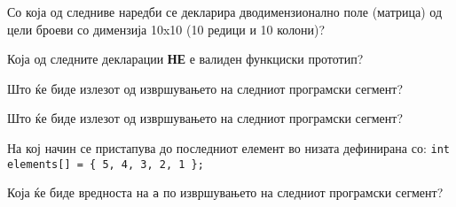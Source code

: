 \documentclass[11pt]{examdesign}
\begin{document}


\begin{multiplechoice}[title={},suppressprefix=yes]

\begin{question}
Со која од следниве наредби се декларира дводимензионално поле (матрица) од цели броеви со димензија 10x10 (10 редици и 10 колони)?
\end{question}

\begin{question}
Која од следните декларации \textbf{НЕ} е валиден функциски прототип?
\end{question}

\begin{question}

Што ќе биде излезот од извршувањето на следниот програмски сегмент?
\end{question}

\begin{question}
Што ќе биде излезот од извршувањето на следниот програмски сегмент?
\end{question}

\begin{question}
На кој начин се пристапува до последниот елемент во низата дефинирана со: 
\texttt{int elements[] = \{ 5, 4, 3, 2, 1 \};}
\end{question}

\begin{question}
Која ќе биде вредноста на \texttt{a} по извршувањето на следниот програмски сегмент?
\end{question}
  

\end{multiplechoice}
\end{document}
